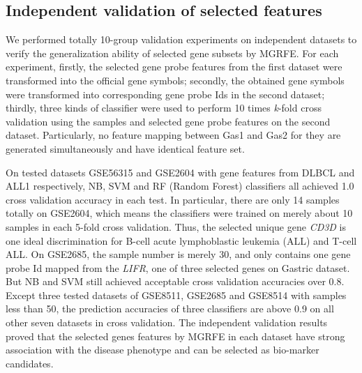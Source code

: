 \documentclass[10pt,journal,compsoc]{IEEEtran}
\begin{document}
	\subsection{Independent validation of selected features}
	We performed totally 10-group validation experiments on independent datasets to verify the generalization ability of selected gene subsets by MGRFE. For each experiment, firstly, the selected gene probe features from the first dataset were transformed into the official gene symbols; secondly, the obtained gene symbols were transformed into corresponding gene probe Ids in the second dataset; thirdly, three kinds of classifier were used to perform 10 times \textit{k}-fold cross validation using the samples and selected gene probe features on the second dataset. Particularly, no feature mapping between Gas1 and Gas2 for they are generated simultaneously and have identical feature set. 

	On tested datasets GSE56315 and GSE2604 with gene features from DLBCL and ALL1 respectively, NB, SVM and RF (Random Forest) classifiers all achieved 1.0 cross validation accuracy in each test. In particular, there are only 14 samples totally on GSE2604, which means the classifiers were trained on merely about 10 samples in each 5-fold cross validation. Thus, the selected unique gene \textit{CD3D} is one ideal discrimination for B-cell acute lymphoblastic leukemia (ALL) and T-cell ALL. On GSE2685, the sample number is merely 30, and only contains one gene probe Id mapped from the \textit{LIFR}, one of three selected genes on Gastric dataset. But NB and SVM still achieved acceptable cross validation accuracies over 0.8. Except three tested datasets of GSE8511, GSE2685 and GSE8514 with samples less than 50, the prediction accuracies of three classifiers are above 0.9 on all other seven datasets in cross validation. The independent validation results proved that the selected genes features by MGRFE in each dataset have strong association with the disease phenotype and can be selected as bio-marker candidates.
%	
%	
\end{document}
